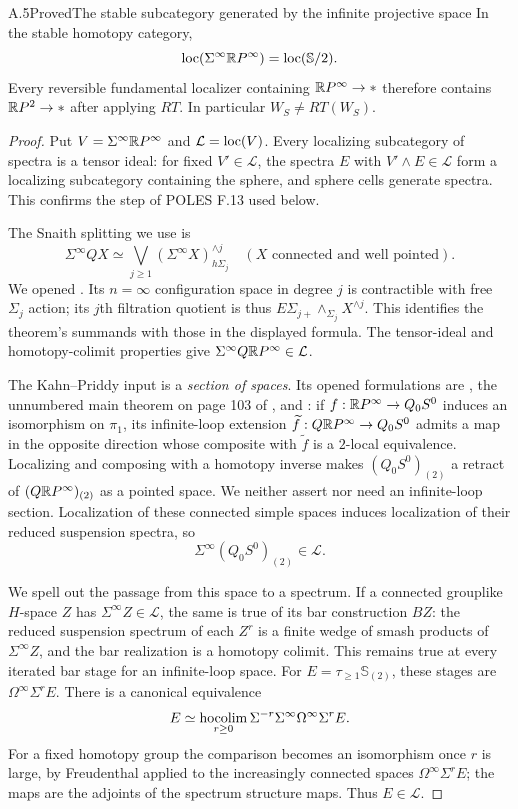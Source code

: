 \begin{claim}{A.5}{Proved}{The stable subcategory generated by the infinite projective space}\label{A5}
In the stable homotopy category,
\[
 \operatorname{loc}(\Sigma^\infty\mathbb{R}P^\infty)=\operatorname{loc}(\mathbb S/2).
\]
Every reversible fundamental localizer containing $\mathbb{R}P^\infty\to *$ therefore contains $\mathbb{R}P^2\to *$ after applying $RT$. In particular $W_S\ne RT(W_S)$.
\end{claim}
\begin{proof}
Put $V=\Sigma^\infty\mathbb{R}P^\infty$ and $\mathcal L=\operatorname{loc}(V)$. Every localizing subcategory of spectra is a tensor ideal: for fixed $V'\in\mathcal L$, the spectra $E$ with $V'\wedge E\in\mathcal L$ form a localizing subcategory containing the sphere, and sphere cells generate spectra. This confirms the step of POLES F.13 used below.

The Snaith splitting we use is
\[
 \Sigma^\infty QX\simeq
 \bigvee_{j\geq1}(\Sigma^\infty X)^{\wedge j}_{h\Sigma_j}
 \quad (X\text{ connected and well pointed}).
\]
We opened \citet[Theorem 1.1 and the filtration of Section 2]{Snaith1974}. Its $n=\infty$ configuration space in degree $j$ is contractible with free $\Sigma_j$ action; its $j$th filtration quotient is thus $E\Sigma_{j+}\wedge_{\Sigma_j}X^{\wedge j}$. This identifies the theorem's summands with those in the displayed formula. The tensor-ideal and homotopy-colimit properties give $\Sigma^\infty Q\mathbb{R}P^\infty\in\mathcal L$.

The Kahn--Priddy input is a \emph{section of spaces}. Its opened formulations are \citet[Theorem 3.1]{KahnPriddy1972}, the unnumbered main theorem on page 103 of \citet{KahnPriddy1978}, and \citet[Theorem 7.5]{Snaith2009}: if $f:\mathbb{R}P^\infty\to Q_0S^0$ induces an isomorphism on $\pi_1$, its infinite-loop extension $\widetilde f:Q\mathbb{R}P^\infty\to Q_0S^0$ admits a map in the opposite direction whose composite with $\widetilde f$ is a $2$-local equivalence. Localizing and composing with a homotopy inverse makes $(Q_0S^0)_{(2)}$ a retract of $(Q\mathbb{R}P^\infty)_{(2)}$ as a pointed space. We neither assert nor need an infinite-loop section. Localization of these connected simple spaces induces localization of their reduced suspension spectra, so
\[
 \Sigma^\infty(Q_0S^0)_{(2)}\in\mathcal L.
\]

We spell out the passage from this space to a spectrum. If a connected grouplike $H$-space $Z$ has $\Sigma^\infty Z\in\mathcal L$, the same is true of its bar construction $BZ$: the reduced suspension spectrum of each $Z^r$ is a finite wedge of smash products of $\Sigma^\infty Z$, and the bar realization is a homotopy colimit. This remains true at every iterated bar stage for an infinite-loop space. For $E=\tau_{\geq1}\mathbb S_{(2)}$, these stages are $\Omega^\infty\Sigma^rE$. There is a canonical equivalence
\[
 E\simeq\operatorname*{hocolim}_{r\geq0}\Sigma^{-r}\Sigma^\infty
                       \Omega^\infty\Sigma^rE.
\]
For a fixed homotopy group the comparison becomes an isomorphism once $r$ is large, by Freudenthal applied to the increasingly connected spaces $\Omega^\infty\Sigma^rE$; the maps are the adjoints of the spectrum structure maps. Thus $E\in\mathcal L$.


\end{proof}
